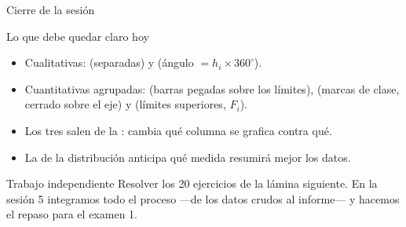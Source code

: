\documentclass[aspectratio=169,10pt]{beamer}
\begin{document}
\begin{frame}{Cierre de la sesión}
  \begin{block}{Lo que debe quedar claro hoy}
    \scriptsize
    \begin{itemize}\setlength{\itemsep}{0.02cm}
      \item Cualitativas:  (separadas) y 
            (ángulo $= h_i \times 360^\circ$).
      \item Cuantitativas agrupadas:  (barras pegadas sobre
            los límites),  (marcas de clase, cerrado sobre el
            eje) y  (límites superiores, $F_i$).
      \item Los tres salen de la : cambia qué columna se
            grafica contra qué.
      \item La  de la distribución anticipa qué medida resumirá
            mejor los datos.
    \end{itemize}
  \end{block}

  \vspace{0.1cm}
  \begin{alertblock}{Trabajo independiente}
    \scriptsize
    Resolver los 20 ejercicios de la lámina siguiente. En la sesión 5
    integramos todo el proceso —de los datos crudos al informe— y hacemos el
    repaso para el examen 1.
  \end{alertblock}
\end{frame}
\end{document}
